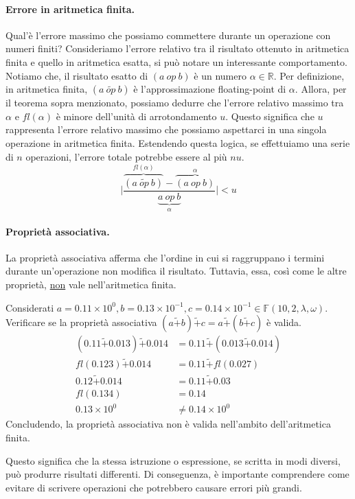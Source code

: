 \documentclass{article}
\begin{document}
\paragraph{Errore in aritmetica finita.}
Qual'è l'errore massimo che possiamo commettere durante un operazione con numeri
finiti?
Consideriamo l'errore relativo tra il risultato ottenuto in aritmetica finita
e quello in aritmetica esatta, si può notare un interessante comportamento. 
Notiamo che, il risultato esatto di $(a\ op\ b)$ è un numero $\alpha\in
\mathbb{R}$. Per definizione, in aritmetica finita, $(a\ \tilde{op}\ b)$ è
l'approssimazione floating-point di $\alpha$.
Allora, per il teorema sopra menzionato, possiamo dedurre che l'errore relativo massimo tra
$\alpha$ e $fl(\alpha)$ è minore dell'unità di arrotondamento $u$. Questo
significa che $u$ rappresenta l'errore relativo massimo che possiamo
aspettarci in una singola operazione in aritmetica finita.
Estendendo questa logica, se effettuiamo una serie di $n$ operazioni, l'errore
totale potrebbe essere al più $nu$.
$$\Big\lvert \frac{\overset{fl(\alpha)}{\overbrace{(a\ \tilde{op}\ b)}}-\overset{\alpha}{\overbrace{(a\ op\
b)}}}{\underset{\alpha}{\underbrace{a\ op\ b}}}\Big\rvert<u$$
\paragraph{Proprietà associativa.} La proprietà associativa afferma che
l'ordine in cui si raggruppano i termini durante un'operazione non modifica il
risultato. Tuttavia, essa, così come le altre proprietà, \underline{non} vale nell'aritmetica finita.
\begin{example}
    Considerati $a=0.11\times10^0,b=0.13\times10^{-1},c=0.14\times10^{-1}\in
    \mathbb{F}(10,2,\lambda,\omega)$.
    Verificare se la proprietà associativa
    $(a\tilde+b)\tilde+c=a\tilde+(b\tilde+c)$ è valida.
    \begin{equation*}
        \begin{aligned}
            (0.11\tilde+0.013)\tilde+0.014&=0.11\tilde+(0.013\tilde+0.014) \\ 
            fl(0.123)\tilde+0.014&=0.11\tilde+fl(0.027)\\ 
            0.12\tilde+0.014&=0.11\tilde+0.03 \\ 
            fl(0.134)&=0.14 \\
            0.13\times10^0&\neq0.14\times10^0
        \end{aligned} 
    \end{equation*}
    Concludendo, la proprietà associativa non è valida nell'ambito dell'aritmetica finita.
\end{example}
Questo significa che la stessa istruzione o espressione, se scritta in modi
diversi, può produrre risultati differenti. 
Di conseguenza, è importante comprendere come evitare di scrivere operazioni che
potrebbero causare errori più grandi.
\end{document}
